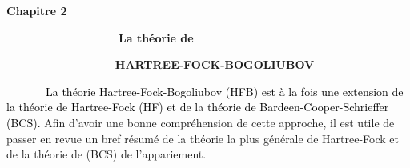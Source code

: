 \documentclass[a4paper]{article}
\begin{document}
\bigskip


\bigskip


\bigskip


\bigskip


\bigskip


\bigskip


\bigskip


\bigskip


\bigskip


\bigskip


\bigskip


\bigskip


\bigskip


\bigskip


\bigskip


\bigskip


\bigskip


\bigskip


\bigskip


\bigskip


\bigskip


\bigskip


\bigskip


\bigskip


\bigskip


\bigskip


\bigskip


\bigskip


\bigskip


\bigskip


\bigskip


\bigskip


\bigskip

\textbf{Chapitre 2}

\ \ \ \ \ \ \ \ \ \ \ \ \ \ \ \ \ \ \ \ \textbf{La théorie de}

\textbf{\ \ \ \ \ \ \ \ \ \ \ \ \ \ \ \ }\ \textbf{HARTREE-FOCK-BOGOLIUBOV}


\bigskip

\textcolor{black}{\ \ \ \ \ \ \ La théorie Hartree-Fock-Bogoliubov (HFB) est à la fois une extension de la théorie de
Hartree-Fock (HF) et de la théorie de Bardeen-Cooper-Schrieffer (BCS).}\textbf{ }Afin d’avoir une bonne compréhension
de cette approche, il est utile de passer en revue un bref résumé de la théorie la plus générale de Hartree-Fock et de
la théorie de (BCS) de l’appariement.
\end{document}
